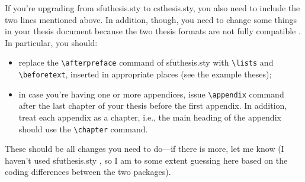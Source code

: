 If you're upgrading%
 from
\textsf{sfuthesis.sty} to \textsf{csthesis.sty}, you also need to
include the two lines mentioned above. In addition, though, you need
to change some things in your thesis document because the two thesis
formats are not fully compatible%
. In
particular, you should:
\begin{itemize}
\item replace the \verb+\afterpreface+ command of
  \textsf{sfuthesis.sty}
  with \verb+\lists+ and \verb+\beforetext+, inserted in appropriate
  places (see the example theses);
\item in case you're having one or more appendices, issue
  \verb+\appendix+ command after the last chapter of your thesis
  before the first appendix. In addition, treat each appendix as a
  chapter, i.e., the main heading of the appendix should use the
  \verb+\chapter+ command.
\end{itemize}
These should be all changes you need to do---if there is more, let me
know (I haven't used \textsf{sfuthesis.sty}%
, so I am to some extent
guessing here based on the coding differences between the two packages).
